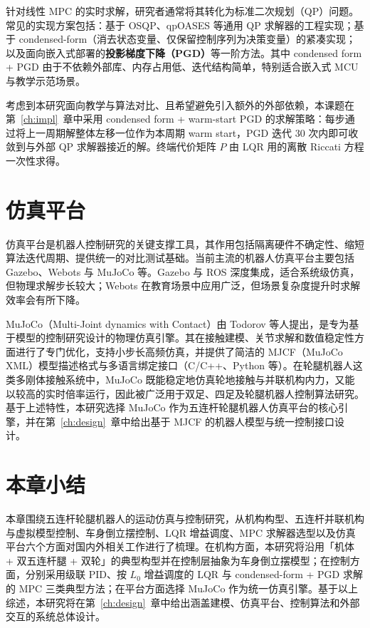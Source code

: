 \documentclass{smbuthesis}
\begin{document}
针对线性 MPC 的实时求解，研究者通常将其转化为标准二次规划（QP）问题。常见的实现方案包括：基于 OSQP\cite{Stellato2020OSQP}、qpOASES 等通用 QP 求解器的工程实现；基于 condensed-form（消去状态变量、仅保留控制序列为决策变量）的紧凑实现\cite{Rawlings2017MPC,Maciejowski2002Predictive}；以及面向嵌入式部署的\textbf{投影梯度下降（PGD）}等一阶方法\cite{Patrinos2014AcceleratedDGP}。其中 condensed form + PGD 由于不依赖外部库、内存占用低、迭代结构简单，特别适合嵌入式 MCU 与教学示范场景。

考虑到本研究面向教学与算法对比、且希望避免引入额外的外部依赖，本课题在第~\ref{ch:impl}~章中采用 condensed form + warm-start PGD 的求解策略：每步通过将上一周期解整体左移一位作为本周期 warm start，PGD 迭代 30 次内即可收敛到与外部 QP 求解器接近的解。终端代价矩阵 $P$ 由 LQR 用的离散 Riccati 方程一次性求得。

\section{仿真平台}

仿真平台是机器人控制研究的关键支撑工具，其作用包括隔离硬件不确定性、缩短算法迭代周期、提供统一的对比测试基础。当前主流的机器人仿真平台主要包括 Gazebo、Webots 与 MuJoCo 等。Gazebo 与 ROS 深度集成，适合系统级仿真，但物理求解步长较大；Webots 在教育场景中应用广泛，但场景复杂度提升时求解效率会有所下降。

MuJoCo（Multi-Joint dynamics with Contact）由 Todorov 等人提出\cite{Todorov2012MuJoCo}，是专为基于模型的控制研究设计的物理仿真引擎。其在接触建模、关节求解和数值稳定性方面进行了专门优化，支持小步长高频仿真，并提供了简洁的 MJCF（MuJoCo XML）模型描述格式与多语言绑定接口（C/C++、Python 等）。在轮腿机器人这类多刚体接触系统中，MuJoCo 既能稳定地仿真轮地接触与并联机构内力，又能以较高的实时倍率运行，因此被广泛用于双足、四足及轮腿机器人控制算法研究\cite{Hwangbo2019Agile,Hutter2017ANYmal}。基于上述特性，本研究选择 MuJoCo 作为五连杆轮腿机器人仿真平台的核心引擎，并在第~\ref{ch:design}~章中给出基于 MJCF 的机器人模型与统一控制接口设计。

\section{本章小结}

本章围绕五连杆轮腿机器人的运动仿真与控制研究，从机构构型、五连杆并联机构与虚拟模型控制、车身倒立摆控制、LQR 增益调度、MPC 求解器选型以及仿真平台六个方面对国内外相关工作进行了梳理。在机构方面，本研究将沿用「机体 + 双五连杆腿 + 双轮」的典型构型并在控制层抽象为车身倒立摆模型；在控制方面，分别采用级联 PID、按 $L_0$ 增益调度的 LQR 与 condensed-form + PGD 求解的 MPC 三类典型方法；在平台方面选择 MuJoCo 作为统一仿真引擎。基于以上综述，本研究将在第~\ref{ch:design}~章中给出涵盖建模、仿真平台、控制算法和外部交互的系统总体设计。
\end{document}
